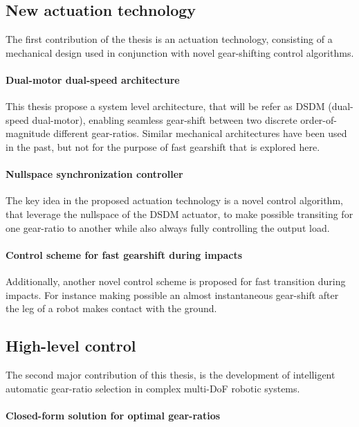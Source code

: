 \subsection{New actuation technology}

The first contribution of the thesis is an actuation technology, consisting of a mechanical design used in conjunction with novel gear-shifting control algorithms. 

\paragraph{Dual-motor dual-speed architecture}

This thesis propose a system level architecture, that will be refer as DSDM (dual-speed dual-motor), enabling seamless gear-shift between two discrete order-of-magnitude different gear-ratios. Similar mechanical architectures have been used in the past, but not for the purpose of fast gearshift that is explored here.

\paragraph{Nullspace synchronization controller}

The key idea in the proposed actuation technology is a novel control algorithm, that leverage the nullspace of the DSDM actuator, to make possible transiting for one gear-ratio to another while also always fully controlling the output load. 

\paragraph{Control scheme for fast gearshift during impacts}

Additionally, another novel control scheme is proposed for fast transition during impacts. For instance making possible an almost instantaneous gear-shift after the leg of a robot makes contact with the ground.


\subsection{High-level control}

The second major contribution of this thesis, is the development of intelligent automatic gear-ratio selection in complex multi-DoF robotic systems.

\paragraph{Closed-form solution for optimal gear-ratios}

